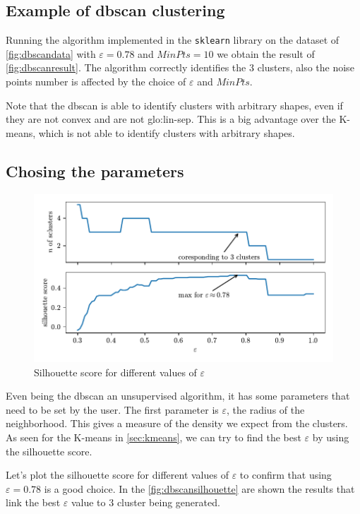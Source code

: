 \subsection{Example of \gls{dbscan} clustering}
Running the algorithm implemented in the \texttt{sklearn} library on the dataset of \autoref{fig:dbscandata} with $\varepsilon = 0.78$ and $MinPts = 10$ we obtain the result of \autoref{fig:dbscanresult}. The algorithm correctly identifies the $3$ clusters, also the noise points number is affected by the choice of $\varepsilon$ and $MinPts$.

Note that the \gls{dbscan} is able to identify clusters with arbitrary shapes, even if they are not convex and are not \gls{glo:lin-sep}. This is a big advantage over the K-means, which is not able to identify clusters with arbitrary shapes.

\subsection{Chosing the parameters}

\begin{figure}
    \centering
    \includegraphics{images/DBSCAN/Figure_4.pdf}
    \caption{Silhouette score for different values of $\varepsilon$}
    \label{fig:dbscansilhouette}
\end{figure}

Even being the \gls{dbscan} an unsupervised algorithm, it has some parameters that need to be set by the user.
The first parameter is $\varepsilon$, the radius of the neighborhood. This gives a measure of the density we expect from the clusters. As seen for the K-means in \autoref{sec:kmeans}, we can try to find the best $\varepsilon$ by using the silhouette score.

Let's plot the silhouette score for different values of $\varepsilon$ to confirm that using $\varepsilon = 0.78$ is a good choice. In the \autoref{fig:dbscansilhouette} are shown the results that link the best $\varepsilon$ value to $3$ cluster being generated.

